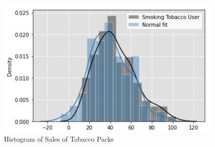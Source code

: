 \documentclass{article}
\begin{document}
\begin{figure}
\raggedright
\begin{minipage}{0.4\textwidth}
  \centering
  \includegraphics[width=1\linewidth]{tob10_2.png}
  \caption{Histogram of Sales of Tobacco Packs}
  \label{fig:figure9}
\end{minipage}%
\end{figure}
\end{document}
